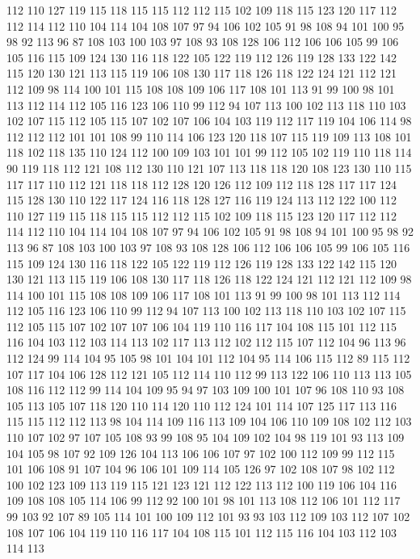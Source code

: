 112 110 127 119 115 118 115 115 112 112 115 102 109 118 115 123 120 117 112 112
114 112 110 104 114 104 108 107 97 94 106 102 105 91 98 108 94 101 100 95
98 92 113 96 87 108 103 100 103 97 108 93 108 128 106 112 106 106 105 99
106 105 116 115 109 124 130 116 118 122 105 122 119 112 126 119 128 133 122 142
115 120 130 121 113 115 119 106 108 130 117 118 126 118 122 124 121 112 121 112
109 98 114 100 101 115 108 108 109 106 117 108 101 113 91 99 100 98 101 113
112 114 112 105 116 123 106 110 99 112 94 107 113 100 102 113 118 110 103 102
107 115 112 105 115 107 102 107 106 104 103 119 112 117 119 104 106 114 98 112
112 112 101 101 108 99 110 114 106 123 120 118 107 115 119 109 113 108 101 118
102 118 135 110 124 112 100 109 103 101 101 99 112 105 102 119 110 118 114 90
119 118 112 121 108 112 130 110 121 107 113 118 118 120 108 123 130 110 115 117
117 110 112 121 118 118 112 128 120 126 112 109 112 118 128 117 117 124 115 128
130 110 122 117 124 116 118 128 127 116 119 124 113 112 122 100 112 110 127 119
115 118 115 115 112 112 115 102 109 118 115 123 120 117 112 112 114 112 110 104
114 104 108 107 97 94 106 102 105 91 98 108 94 101 100 95 98 92 113 96
87 108 103 100 103 97 108 93 108 128 106 112 106 106 105 99 106 105 116 115
109 124 130 116 118 122 105 122 119 112 126 119 128 133 122 142 115 120 130 121
113 115 119 106 108 130 117 118 126 118 122 124 121 112 121 112 109 98 114 100
101 115 108 108 109 106 117 108 101 113 91 99 100 98 101 113 112 114 112 105
116 123 106 110 99 112 94 107 113 100 102 113 118 110 103 102 107 115 112 105
115 107 102 107 107 106 104 119 110 116 117 104 108 115 101 112 115 116 104 103
112 103 114 113 102 117 113 112 102 112 115 107 112 104 96 113 96 112 124 99
114 104 95 105 98 101 104 101 112 104 95 114 106 115 112 89 115 112 107 117
104 106 128 112 121 105 112 114 110 112 99 113 122 106 110 113 113 105 108 116
112 112 99 114 104 109 95 94 97 103 109 100 101 107 96 108 110 93 108 105
113 105 107 118 120 110 114 120 110 112 124 101 114 107 125 117 113 116 115 115
112 112 113 98 104 114 109 116 113 109 104 106 110 109 108 102 112 103 110 107
102 97 107 105 108 93 99 108 95 104 109 102 104 98 119 101 93 113 109 104
105 98 107 92 109 126 104 113 106 106 107 97 102 100 112 109 99 112 115 101
106 108 91 107 104 96 106 101 109 114 105 126 97 102 108 107 98 102 112 100
102 123 109 113 119 115 121 123 121 112 122 113 112 100 119 106 104 116 109 108
108 105 114 106 99 112 92 100 101 98 101 113 108 112 106 101 112 117 99 103
92 107 89 105 114 101 100 109 112 101 93 93 103 112 109 103 112 107 102 108
107 106 104 119 110 116 117 104 108 115 101 112 115 116 104 103 112 103 114 113
